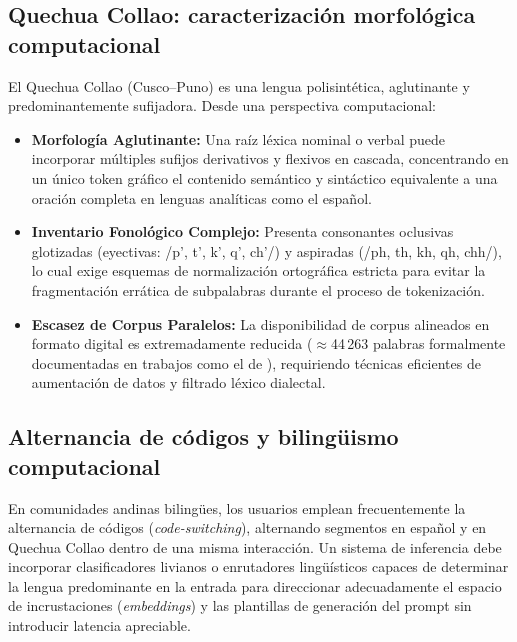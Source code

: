 \subsection{Quechua Collao: caracterización morfológica computacional}
El Quechua Collao (Cusco--Puno) es una lengua polisintética, aglutinante y predominantemente sufijadora. Desde una perspectiva computacional:
\begin{itemize}
    \item \textbf{Morfología Aglutinante:} Una raíz léxica nominal o verbal puede incorporar múltiples sufijos derivativos y flexivos en cascada, concentrando en un único token gráfico el contenido semántico y sintáctico equivalente a una oración completa en lenguas analíticas como el español.
    \item \textbf{Inventario Fonológico Complejo:} Presenta consonantes oclusivas glotizadas (eyectivas: /p', t', k', q', ch'/) y aspiradas (/ph, th, kh, qh, chh/), lo cual exige esquemas de normalización ortográfica estricta para evitar la fragmentación errática de subpalabras durante el proceso de tokenización.
    \item \textbf{Escasez de Corpus Paralelos:} La disponibilidad de corpus alineados en formato digital es extremadamente reducida ($\approx$44\,263 palabras formalmente documentadas en trabajos como el de \citet{Orcotoma2025}), requiriendo técnicas eficientes de aumentación de datos y filtrado léxico dialectal.
\end{itemize}

\subsection{Alternancia de códigos y bilingüismo computacional}
En comunidades andinas bilingües, los usuarios emplean frecuentemente la alternancia de códigos (\textit{code-switching}), alternando segmentos en español y en Quechua Collao dentro de una misma interacción. Un sistema de inferencia debe incorporar clasificadores livianos o enrutadores lingüísticos capaces de determinar la lengua predominante en la entrada para direccionar adecuadamente el espacio de incrustaciones (\textit{embeddings}) y las plantillas de generación del prompt sin introducir latencia apreciable.

